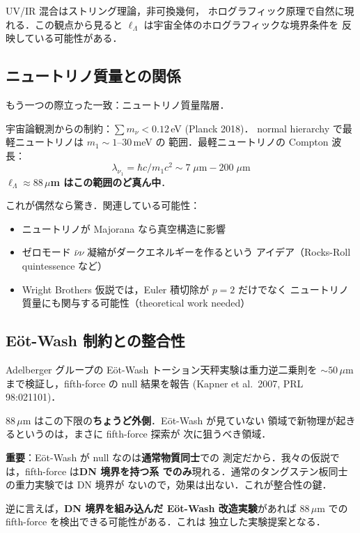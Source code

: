 \documentclass[11pt,a4paper]{article}
\begin{document}
UV/IR 混合はストリング理論，非可換幾何，
ホログラフィック原理で自然に現れる．この観点から見ると
$\ell_\Lambda$ は宇宙全体のホログラフィックな境界条件を
反映している可能性がある．

\subsection{ニュートリノ質量との関係}

もう一つの際立った一致：ニュートリノ質量階層．

宇宙論観測からの制約：$\sum m_\nu < 0.12$\,eV (Planck 2018)．
normal hierarchy で最軽ニュートリノは $m_1 \sim 1$--$30$\,meV の
範囲．最軽ニュートリノの Compton 波長：
\begin{equation}
\lambda_{\nu_1} = \hbar c / m_1 c^2 \sim 7\;\mu\text{m} - 200\;\mu\text{m}
\end{equation}
\textbf{$\ell_\Lambda \approx 88\,\mu$m はこの範囲のど真ん中}．

これが偶然なら驚き．関連している可能性：
\begin{itemize}
\item ニュートリノが Majorana なら真空構造に影響
\item ゼロモード $\bar\nu\nu$ 凝縮がダークエネルギーを作るという
アイデア（Rocks-Roll quintessence など）
\item Wright Brothers 仮説では，Euler 積切除が $p=2$ だけでなく
ニュートリノ質量にも関与する可能性（theoretical work needed）
\end{itemize}

\subsection{Eöt-Wash 制約との整合性}

Adelberger グループの Eöt-Wash トーション天秤実験は重力逆二乗則を
$\sim 50\,\mu$m まで検証し，fifth-force の null 結果を報告
(Kapner et al.\ 2007, PRL 98:021101)．

$88\,\mu$m はこの下限の\textbf{ちょうど外側}．Eöt-Wash が見ていない
領域で新物理が起きるというのは，まさに fifth-force 探索が
次に狙うべき領域．

\textbf{重要}：Eöt-Wash が null なのは\textbf{通常物質同士}での
測定だから．我々の仮説では，fifth-force は\textbf{DN 境界を持つ系
でのみ}現れる．通常のタングステン板同士の重力実験では DN 境界が
ないので，効果は出ない．これが整合性の鍵．

逆に言えば，\textbf{DN 境界を組み込んだ Eöt-Wash 改造実験}があれば
$88\,\mu$m での fifth-force を検出できる可能性がある．これは
独立した実験提案となる．
\end{document}

